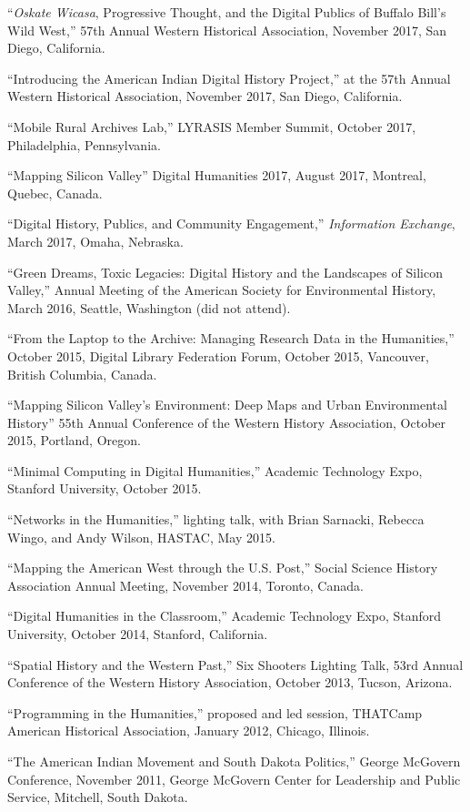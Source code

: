``\emph{Oskate Wicasa}, Progressive Thought, and the Digital Publics of
Buffalo Bill's Wild West,'' 57th Annual Western Historical Association,
November 2017, San Diego, California.

``Introducing the American Indian Digital History Project,'' at the 57th
Annual Western Historical Association, November 2017, San Diego,
California.

``Mobile Rural Archives Lab,'' LYRASIS Member Summit, October 2017,
Philadelphia, Pennsylvania.

``Mapping Silicon Valley'' Digital Humanities 2017, August 2017,
Montreal, Quebec, Canada.

``Digital History, Publics, and Community Engagement,''
\emph{Information Exchange}, March 2017, Omaha, Nebraska.

``Green Dreams, Toxic Legacies: Digital History and the Landscapes of
Silicon Valley,'' Annual Meeting of the American Society for
Environmental History, March 2016, Seattle, Washington (did not attend).

``From the Laptop to the Archive: Managing Research Data in the
Humanities,'' October 2015, Digital Library Federation Forum, October
2015, Vancouver, British Columbia, Canada.

``Mapping Silicon Valley's Environment: Deep Maps and Urban
Environmental History'' 55th Annual Conference of the Western History
Association, October 2015, Portland, Oregon.

``Minimal Computing in Digital Humanities,'' Academic Technology Expo,
Stanford University, October 2015.

``Networks in the Humanities,'' lighting talk, with Brian Sarnacki,
Rebecca Wingo, and Andy Wilson, HASTAC, May 2015.

``Mapping the American West through the U.S. Post,'' Social Science
History Association Annual Meeting, November 2014, Toronto, Canada.

``Digital Humanities in the Classroom,'' Academic Technology Expo,
Stanford University, October 2014, Stanford, California.

``Spatial History and the Western Past,'' Six Shooters Lighting Talk,
53rd Annual Conference of the Western History Association, October 2013,
Tucson, Arizona.

``Programming in the Humanities,'' proposed and led session, THATCamp
American Historical Association, January 2012, Chicago, Illinois.

``The American Indian Movement and South Dakota Politics,'' George
McGovern Conference, November 2011, George McGovern Center for
Leadership and Public Service, Mitchell, South Dakota.

